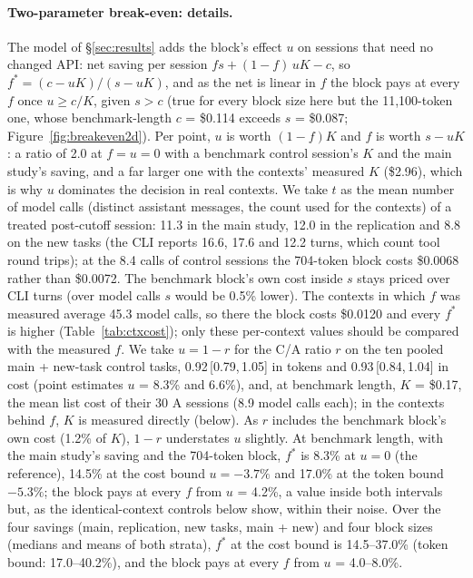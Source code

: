 \documentclass[11pt]{article}
\newcommand{\ci}[2]{\,[#1,\,#2]}
\begin{document}
\paragraph{Two-parameter break-even: details.}
The model of \S\ref{sec:results} adds the block's effect $u$ on sessions that need no changed API: net saving per session $f s + (1-f)\,u K - c$, so $f^{*} = (c - uK)/(s - uK)$, and as the net is linear in $f$ the block pays at every $f$ once $u \geq c/K$, given $s > c$ (true for every block size here but the 11,100-token one, whose benchmark-length $c$ = \$0.114 exceeds $s$ = \$0.087; Figure~\ref{fig:breakeven2d}).
Per point, $u$ is worth $(1-f)K$ and $f$ is worth $s - uK$: a ratio of 2.0 at $f = u = 0$ with a benchmark control session's $K$ and the main study's saving, and a far larger one with the contexts' measured $K$ (\$2.96), which is why $u$ dominates the decision in real contexts.
We take $t$ as the mean number of model calls (distinct assistant messages, the count used for the contexts) of a treated post-cutoff session: 11.3 in the main study, 12.0 in the replication and 8.8 on the new tasks (the CLI reports 16.6, 17.6 and 12.2 turns, which count tool round trips); at the 8.4 calls of control sessions the 704-token block costs \$0.0068 rather than \$0.0072. The benchmark block's own cost inside $s$ stays priced over CLI turns (over model calls $s$ would be 0.5\% lower). The contexts in which $f$ was measured average 45.3 model calls, so there the block costs \$0.0120 and every $f^{*}$ is higher (Table~\ref{tab:ctxcost}); only these per-context values should be compared with the measured $f$.
We take $u = 1 - r$ for the C/A ratio $r$ on the ten pooled main + new-task control tasks, 0.92\ci{0.79}{1.05} in tokens and 0.93\ci{0.84}{1.04} in cost (point estimates $u$ = 8.3\% and 6.6\%), and, at benchmark length, $K$ = \$0.17, the mean list cost of their 30 A sessions (8.9 model calls each); in the contexts behind $f$, $K$ is measured directly (below).
As $r$ includes the benchmark block's own cost (1.2\% of $K$), $1-r$ understates $u$ slightly.
At benchmark length, with the main study's saving and the 704-token block, $f^{*}$ is 8.3\% at $u = 0$ (the reference), 14.5\% at the cost bound $u = -3.7\%$ and 17.0\% at the token bound $-5.3\%$; the block pays at every $f$ from $u$ = 4.2\%, a value inside both intervals but, as the identical-context controls below show, within their noise.
Over the four savings (main, replication, new tasks, main + new) and four block sizes (medians and means of both strata), $f^{*}$ at the cost bound is 14.5--37.0\% (token bound: 17.0--40.2\%), and the block pays at every $f$ from $u$ = 4.0--8.0\%.
\end{document}
